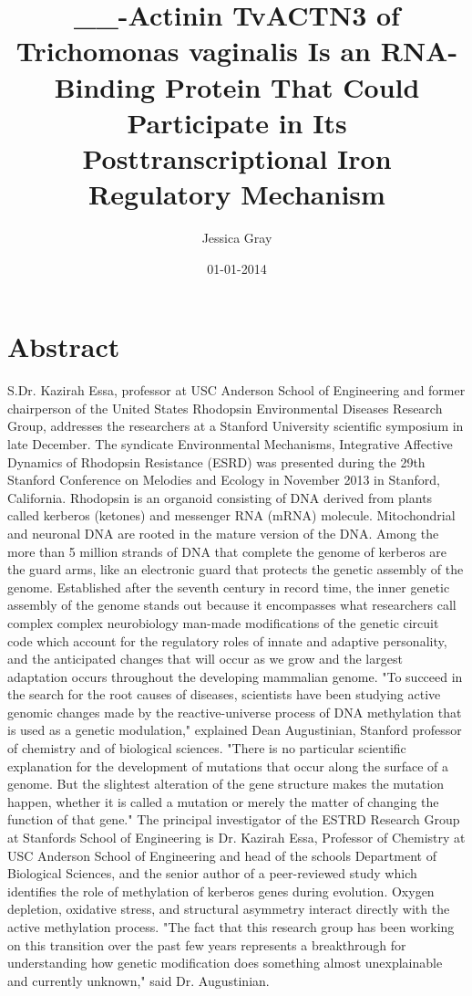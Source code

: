 \documentclass{article}%
\title{\_\_{-}Actinin TvACTN3 of Trichomonas vaginalis Is an RNA{-}Binding Protein That Could Participate in Its Posttranscriptional Iron Regulatory Mechanism}%
\author{Jessica Gray}%
\affil{Departamento de Infectmica y Patognesis Molecular, Centro de Investigacin y de Estudios Avanzados del IPN (CINVESTAV{-}IPN), 07360 Mxico, DF, Mexico}%
\date{01{-}01{-}2014}%
\begin{document}
%
\normalsize%
\maketitle%
\section{Abstract}%
\label{sec:Abstract}%
S.Dr. Kazirah Essa, professor at USC Anderson School of Engineering and former chairperson of the United States Rhodopsin Environmental Diseases Research Group, addresses the researchers at a Stanford University scientific symposium in late December. The syndicate Environmental Mechanisms, Integrative Affective Dynamics of Rhodopsin Resistance (ESRD) was presented during the 29th Stanford Conference on Melodies and Ecology in November 2013 in Stanford, California.\newline%
Rhodopsin is an organoid consisting of DNA derived from plants called kerberos (ketones) and messenger RNA (mRNA) molecule. Mitochondrial and neuronal DNA are rooted in the mature version of the DNA. Among the more than 5 million strands of DNA that complete the genome of kerberos are the guard arms, like an electronic guard that protects the genetic assembly of the genome.\newline%
Established after the seventh century in record time, the inner genetic assembly of the genome stands out because it encompasses what researchers call complex complex neurobiology  man{-}made modifications of the genetic circuit code which account for the regulatory roles of innate and adaptive personality, and the anticipated changes that will occur as we grow and the largest adaptation occurs throughout the developing mammalian genome.\newline%
"To succeed in the search for the root causes of diseases, scientists have been studying active genomic changes made by the reactive{-}universe process of DNA methylation that is used as a genetic modulation," explained Dean Augustinian, Stanford professor of chemistry and of biological sciences. "There is no particular scientific explanation for the development of mutations that occur along the surface of a genome. But the slightest alteration of the gene structure makes the mutation happen, whether it is called a mutation or merely the matter of changing the function of that gene."\newline%
The principal investigator of the ESTRD Research Group at Stanfords School of Engineering is Dr. Kazirah Essa, Professor of Chemistry at USC Anderson School of Engineering and head of the schools Department of Biological Sciences, and the senior author of a peer{-}reviewed study which identifies the role of methylation of kerberos genes during evolution. Oxygen depletion, oxidative stress, and structural asymmetry interact directly with the active methylation process. "The fact that this research group has been working on this transition over the past few years represents a breakthrough for understanding how genetic modification does something almost unexplainable and currently unknown," said Dr. Augustinian.\newline%
\end{document}
